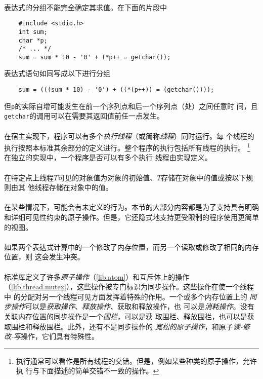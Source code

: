 \paragraph{}
\ex 表达式的分组不能完全确定其求值。在下面的片段中
\begin{lstlisting}
    #include <stdio.h>
    int sum;
    char *p;
    /* ... */
    sum = sum * 10 - '0' + (*p++ = getchar());
\end{lstlisting}
表达式语句如同写成以下进行分组
\begin{lstlisting}
    sum = (((sum * 10) - '0') + ((*(p++)) = (getchar())));
\end{lstlisting}
但\texttt{p}的实际自增可能发生在前一个序列点和后一个序列点（\tm{;}处）之间任意时
间，且\texttt{getchar}的调用可以在需要其返回值前任一点发生。


\paragraph{}
在宿主实现下，程序可以有多个\textit{执行线程}（或简称\textit{线程}）同时运行。每
个线程的执行按照本标准其余部分的定义进行。整个程序的执行包括所有线程的执行。
\footnote{执行通常可以看作是所有线程的交错。但是，例如某些种类的原子操作，允许执
行与下面描述的简单交错不一致的操作。} 在独立的实现中，一个程序是否可以有多个执行
线程由实现定义。

\paragraph{}
在特定点上线程$T$可见的对象值为对象的初始值、$T$存储在对象中的值或按以下规则由其
他线程存储在对象中的值。

\paragraph{}
\notes 在某些情况下，可能会有未定义的行为。本节的大部分内容都是为了支持具有明确
和详细可见性约束的原子操作。但是，它还隐式地支持更受限制的程序使用更简单的视图。

\paragraph{}
如果两个表达式计算中的一个修改了内存位置，而另一个读取或修改了相同的内存位置，则
这会发生冲突。

\paragraph{}
标准库定义了许多\textit{原子操作}（\ref{lib.atom}）和互斥体上的操作
（\ref{lib.thread.mutex}），这些操作被专门标识为同步操作。这些操作在使一个线程中
的分配对另一个线程可见方面发挥着特殊的作用。一个或多个内存位置上的
\textit{同步操作}可以是\textit{获取操作}、\textit{释放操作}、获取和释放操作，也
可以是\textit{消耗操作}。没有关联内存位置的同步操作是一个\textit{围栏}，可以是获
取围栏、释放围栏，也可以是获取围栏和释放围栏。此外，还有不是同步操作的
\textit{宽松的原子操作}，和原子\textit{读-修改-写}操作，它们具有特殊性。

